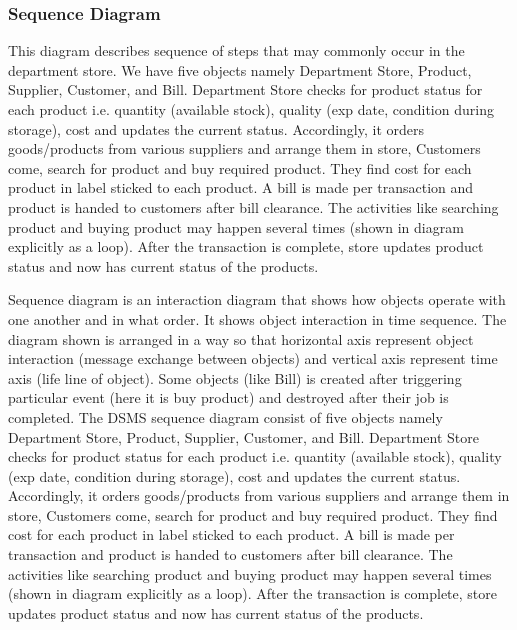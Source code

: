 \subsubsection{Sequence Diagram}

This diagram describes sequence of steps that may commonly occur in the
department store. We have five objects namely Department Store, Product,
Supplier, Customer, and Bill. Department Store checks for product status for
each product i.e. quantity (available stock), quality (exp date, condition
during storage), cost and updates the current status. Accordingly, it orders
goods/products from various suppliers and arrange them in store, Customers
come, search for product and buy required product. They find cost for each
product in label sticked to each product. A bill is made per transaction and
product is handed to customers after bill clearance. The activities like
searching product and buying product may happen several times (shown in diagram
explicitly as a loop). After the transaction is complete, store updates product
status and now has current status of the products.

Sequence diagram is an interaction diagram that shows how objects operate with
one another and in what order. It shows object interaction in time sequence.
The diagram shown is arranged in a way so that horizontal axis represent object
interaction (message exchange between objects) and vertical axis represent time
axis (life line of object). Some objects (like Bill) is created after
triggering particular event (here it is buy product) and destroyed after their
job is completed. The DSMS sequence diagram consist of five objects namely
Department Store, Product, Supplier, Customer, and Bill. Department Store
checks for product status for each product i.e. quantity (available stock),
quality (exp date, condition during storage), cost and updates the current
status. Accordingly, it orders goods/products from various suppliers and
arrange them in store, Customers come, search for product and buy required
product. They find cost for each product in label sticked to each product. A
bill is made per transaction and product is handed to customers after bill
clearance. The activities like searching product and buying product may happen
several times (shown in diagram explicitly as a loop). After the transaction is
complete, store updates product status and now has current status of the
products.

